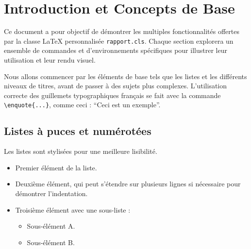 \documentclass{butexFR}
\begin{document}
\fairepagedegarde[3]

\fairemarges

\tabledematieres


\section{Introduction et Concepts de Base}

Ce document a pour objectif de démontrer les multiples fonctionnalités offertes par la classe \LaTeX{} personnalisée \texttt{rapport.cls}. Chaque section explorera un ensemble de commandes et d'environnements spécifiques pour illustrer leur utilisation et leur rendu visuel.


Nous allons commencer par les éléments de base tels que les listes et les différents niveaux de titres, avant de passer à des sujets plus complexes. L'utilisation correcte des guillemets typographiques français se fait avec la commande \verb|\enquote{...}|, comme ceci : \enquote{Ceci est un exemple}.

\subsection{Listes à puces et numérotées}

Les listes sont stylisées pour une meilleure lisibilité.

\begin{itemize}
\item Premier élément de la liste.
\item Deuxième élément, qui peut s'étendre sur plusieurs lignes si nécessaire pour démontrer l'indentation.
\item Troisième élément avec une sous-liste :
\begin{itemize}
\item Sous-élément A.
\item Sous-élément B.
\end{itemize}
\end{itemize}
\end{document}
